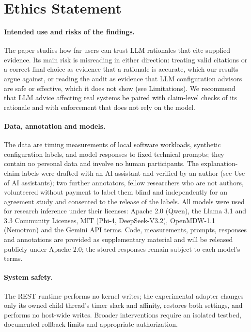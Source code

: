 \section*{Ethics Statement}
\label{sec:ethics}
\paragraph{Intended use and risks of the findings.}
The paper studies how far users can trust LLM rationales that cite supplied evidence. Its main risk is misreading in either direction: treating valid citations or a correct final choice as evidence that a rationale is accurate, which our results argue against, or reading the audit as evidence that LLM configuration advisors are safe or effective, which it does not show (see Limitations). We recommend that LLM advice affecting real systems be paired with claim-level checks of its rationale and with enforcement that does not rely on the model.

\paragraph{Data, annotation and models.}
The data are timing measurements of local software workloads, synthetic configuration labels, and model responses to fixed technical prompts; they contain no personal data and involve no human participants. The explanation-claim labels were drafted with an AI assistant and verified by an author (see Use of AI assistants); two further annotators, fellow researchers who are not authors, volunteered without payment to label them blind and independently for an agreement study and consented to the release of the labels. All models were used for research inference under their licenses: Apache 2.0 (Qwen), the Llama 3.1 and 3.3 Community Licenses, MIT (Phi-4, DeepSeek-V3.2), OpenMDW-1.1 (Nemotron) and the Gemini API terms. Code, measurements, prompts, responses and annotations are provided as supplementary material and will be released publicly under Apache 2.0; the stored responses remain subject to each model's terms.

\paragraph{System safety.}
The REST runtime performs no kernel writes; the experimental adapter changes only its owned child thread's timer slack and affinity, restores both settings, and performs no host-wide writes. Broader interventions require an isolated testbed, documented rollback limits and appropriate authorization.

